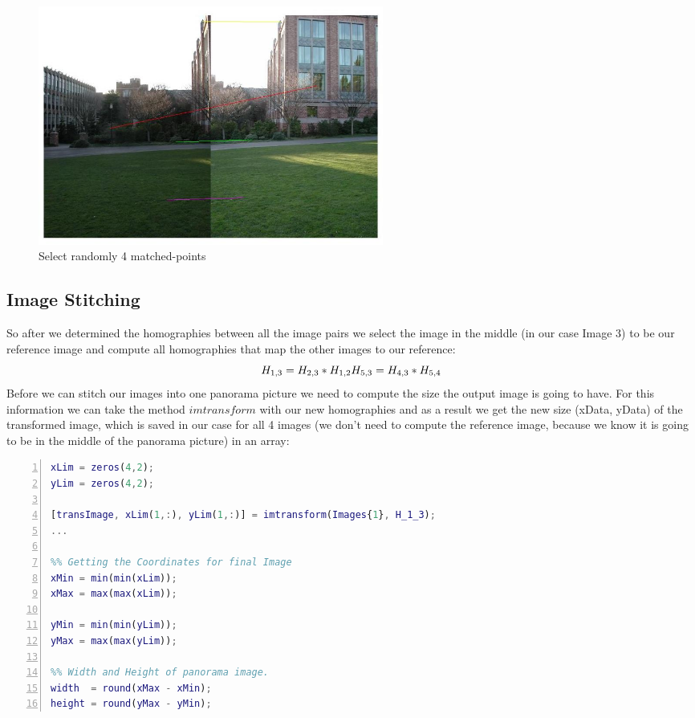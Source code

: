 \documentclass[subfigure,epsfig,fleqn,float,numbers=noenddot]{scrartcl}
\begin{document}
	\begin{figure}[H]
		\centering
		\includegraphics[width=0.55\textwidth]{./img/fourRandomMatches.jpg}
		\caption{Select randomly 4 matched-points}
		\label{img:points}
	\end{figure}

\subsection{Image Stitching}
\label{sec:C}
So after we determined the homographies between all the image pairs we select the image in the middle (in our case Image 3) to be our reference image and compute all homographies that map the other images to our reference:
\begin{equation*}
\\H_{1,3} = H_{2,3} * H_{1,2} \\
H_{5,3} = H_{4,3} * H_{5,4} 
\end{equation*}
Before we can stitch our images into one panorama picture we need to compute the size the output image is going to have. For this information we can take the method $imtransform$ with our new homographies and as a result we get the new size (xData, yData) of the transformed image, which is saved in our case for all 4 images (we don't need to compute the reference image, because we know it is going to be in the middle of the panorama picture) in an array: 
\begin{lstlisting}[language=Matlab, numbers=left, numberstyle=\tiny]
%% saves the dimensions of all the transformed images
xLim = zeros(4,2);
yLim = zeros(4,2);
	
[transImage, xLim(1,:), yLim(1,:)] = imtransform(Images{1}, H_1_3);
...
	
%% Getting the Coordinates for final Image
xMin = min(min(xLim));
xMax = max(max(xLim));
   
yMin = min(min(yLim));
yMax = max(max(yLim));
   
%% Width and Height of panorama image.
width  = round(xMax - xMin);	
height = round(yMax - yMin);
\end{lstlisting}
\end{document}
